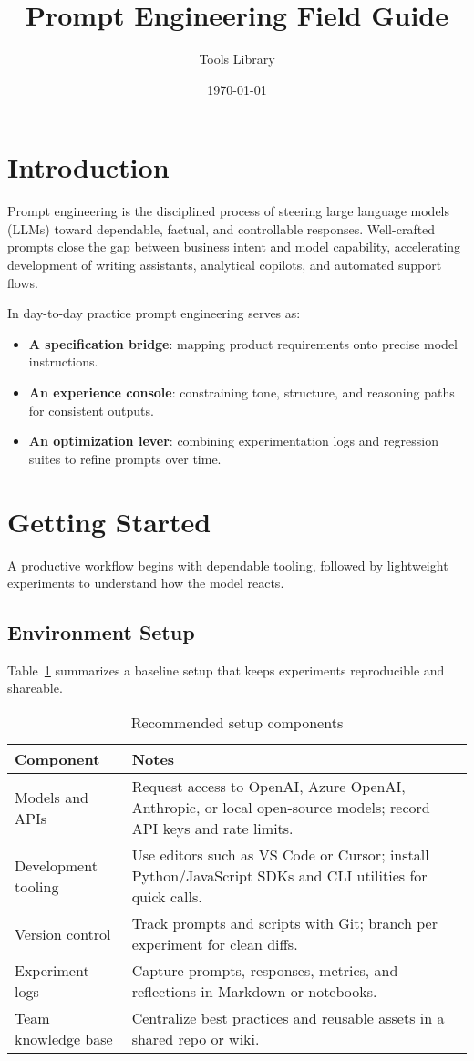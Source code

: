 ﻿\documentclass[12pt]{article}
\title{Prompt Engineering Field Guide}
\author{Tools Library}
\date{\today}
\begin{document}
\maketitle

\section{Introduction}
Prompt engineering is the disciplined process of steering large language models (LLMs) toward dependable, factual, and controllable responses. Well-crafted prompts close the gap between business intent and model capability, accelerating development of writing assistants, analytical copilots, and automated support flows.

In day-to-day practice prompt engineering serves as:
\begin{itemize}[leftmargin=*,itemsep=0.4em]
  \item \textbf{A specification bridge}: mapping product requirements onto precise model instructions.
  \item \textbf{An experience console}: constraining tone, structure, and reasoning paths for consistent outputs.
  \item \textbf{An optimization lever}: combining experimentation logs and regression suites to refine prompts over time.
\end{itemize}

\section{Getting Started}
A productive workflow begins with dependable tooling, followed by lightweight experiments to understand how the model reacts.

\subsection{Environment Setup}
Table~\ref{tab:setup-en} summarizes a baseline setup that keeps experiments reproducible and shareable.

\begin{table}[h]
  \centering
  \caption{Recommended setup components}
  \label{tab:setup-en}
  \begin{tabular}{p{4cm}p{9cm}}
    \toprule
    Component & Notes \\
    \midrule
    Models and APIs & Request access to OpenAI, Azure OpenAI, Anthropic, or local open-source models; record API keys and rate limits. \\
    Development tooling & Use editors such as VS Code or Cursor; install Python/JavaScript SDKs and CLI utilities for quick calls. \\
    Version control & Track prompts and scripts with Git; branch per experiment for clean diffs. \\
    Experiment logs & Capture prompts, responses, metrics, and reflections in Markdown or notebooks. \\
    Team knowledge base & Centralize best practices and reusable assets in a shared repo or wiki. \\
    \bottomrule
  \end{tabular}
\end{table}
\end{document}
